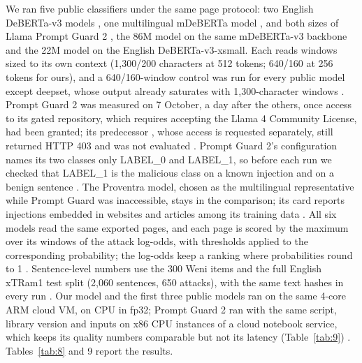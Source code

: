 \documentclass[11pt]{article}
\begin{document}
We ran five public classifiers under the same page protocol: two English DeBERTa-v3 models \citep{protectai2024deberta, deepset2023deberta}, one multilingual mDeBERTa model \citep{proventra2025mdeberta}, and both sizes of Llama Prompt Guard 2 \citep{meta2025promptguard2}, the 86M model on the same mDeBERTa-v3 backbone and the 22M model on the English DeBERTa-v3-xsmall. Each reads windows sized to its own context (1,300/200 characters at 512 tokens; 640/160 at 256 tokens for ours), and a 640/160-window control was run for every public model except deepset, whose output already saturates with 1,300-character windows%
. Prompt Guard 2 was measured on 7 October, a day after the others, once access to its gated repository, which requires accepting the Llama 4 Community License, had been granted; its predecessor \citep{meta2024promptguard}, whose access is requested separately, still returned HTTP 403 and was not evaluated%
. Prompt Guard 2's configuration names its two classes only LABEL\_0 and LABEL\_1, so before each run we checked that LABEL\_1 is the malicious class on a known injection and on a benign sentence%
. The Proventra model, chosen as the multilingual representative while Prompt Guard was inaccessible, stays in the comparison; its card reports injections embedded in websites and articles among its training data%
. All six models read the same exported pages, and each page is scored by the maximum over its windows of the attack log-odds, with thresholds applied to the corresponding probability; the log-odds keep a ranking where probabilities round to 1%
. Sentence-level numbers use the 300 Weni items and the full English xTRam1 test split (2,060 sentences, 650 attacks), with the same text hashes in every run%
. Our model and the first three public models ran on the same 4-core ARM cloud VM, on CPU in fp32; Prompt Guard 2 ran with the same script, library version and inputs on x86 CPU instances of a cloud notebook service, which keeps its quality numbers comparable but not its latency (Table~\ref{tab:9})%
. Tables~\ref{tab:8} and 9 report the results.
\end{document}
